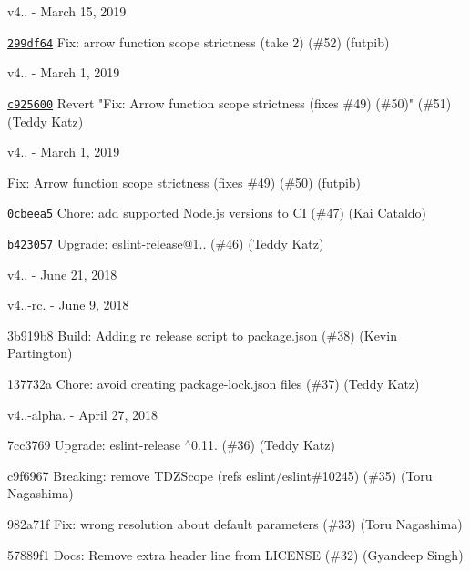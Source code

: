 v4.. -\/ March 15, 2019


\begin{DoxyItemize}
\item \href{https://github.com/eslint/eslint-scope/commit/299df64bdafb30b4d9372e4b7af0cf51a3818c4a}{\texttt{ {\ttfamily 299df64}}} Fix\+: arrow function scope strictness (take 2) (\#52) (futpib)
\end{DoxyItemize}

v4.. -\/ March 1, 2019


\begin{DoxyItemize}
\item \href{https://github.com/eslint/eslint-scope/commit/c925600a684ae0f71b96f85339437a43b4d50d99}{\texttt{ {\ttfamily c925600}}} Revert "{}\+Fix\+: Arrow function scope strictness (fixes \#49) (\#50)"{} (\#51) (Teddy Katz)
\end{DoxyItemize}

v4.. -\/ March 1, 2019


\begin{DoxyItemize}
\item \href{https://github.com/eslint/eslint-scope/commit/2533966faf317df5a3847fab937ba462c16808b8}{\texttt{ {}}} Fix\+: Arrow function scope strictness (fixes \#49) (\#50) (futpib)
\item \href{https://github.com/eslint/eslint-scope/commit/0cbeea51dfb66ab88ea34b0e3b4ad5e6cc210f2f}{\texttt{ {\ttfamily 0cbeea5}}} Chore\+: add supported Node.\+js versions to CI (\#47) (Kai Cataldo)
\item \href{https://github.com/eslint/eslint-scope/commit/b42305760638b8edf4667acf1445e450869bd983}{\texttt{ {\ttfamily b423057}}} Upgrade\+: eslint-\/release@1.. (\#46) (Teddy Katz)
\end{DoxyItemize}

v4.. -\/ June 21, 2018

v4..-\/rc. -\/ June 9, 2018


\begin{DoxyItemize}
\item 3b919b8 Build\+: Adding rc release script to package.\+json (\#38) (Kevin Partington)
\item 137732a Chore\+: avoid creating package-\/lock.\+json files (\#37) (Teddy Katz)
\end{DoxyItemize}

v4..-\/alpha. -\/ April 27, 2018


\begin{DoxyItemize}
\item 7cc3769 Upgrade\+: eslint-\/release \texorpdfstring{$^\wedge$}{\string^}0.11. (\#36) (Teddy Katz)
\item c9f6967 Breaking\+: remove TDZScope (refs eslint/eslint\#10245) (\#35) (Toru Nagashima)
\item 982a71f Fix\+: wrong resolution about default parameters (\#33) (Toru Nagashima)
\item 57889f1 Docs\+: Remove extra header line from LICENSE (\#32) (Gyandeep Singh)
\end{DoxyItemize}

